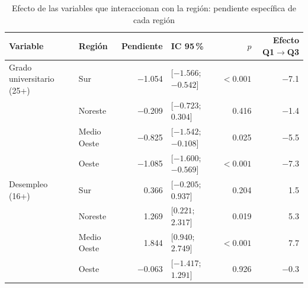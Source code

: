 \begin{table}[htbp]
\centering
\footnotesize
\caption{Efecto de las variables que interaccionan con la región: pendiente específica de cada región}\label{tab:pendientes}
\begin{tabular}{l l r l r r}
\toprule
Variable & Región & Pendiente & IC 95\,\% & $p$ & Efecto Q1$\to$Q3 \\
\midrule
Grado universitario (25+) & Sur & \num{-1.054} & $[\num{-1.566};$\allowbreak\ $\num{-0.542}]$ & $<\num{0.001}$ & \num{-7.1} \\
 & Noreste & \num{-0.209} & $[\num{-0.723};$\allowbreak\ $\num{0.304}]$ & \num{0.416} & \num{-1.4} \\
 & Medio Oeste & \num{-0.825} & $[\num{-1.542};$\allowbreak\ $\num{-0.108}]$ & \num{0.025} & \num{-5.5} \\
 & Oeste & \num{-1.085} & $[\num{-1.600};$\allowbreak\ $\num{-0.569}]$ & $<\num{0.001}$ & \num{-7.3} \\
\addlinespace
Desempleo (16+) & Sur & \num{0.366} & $[\num{-0.205};$\allowbreak\ $\num{0.937}]$ & \num{0.204} & \num{1.5} \\
 & Noreste & \num{1.269} & $[\num{0.221};$\allowbreak\ $\num{2.317}]$ & \num{0.019} & \num{5.3} \\
 & Medio Oeste & \num{1.844} & $[\num{0.940};$\allowbreak\ $\num{2.749}]$ & $<\num{0.001}$ & \num{7.7} \\
 & Oeste & \num{-0.063} & $[\num{-1.417};$\allowbreak\ $\num{1.291}]$ & \num{0.926} & \num{-0.3} \\
\bottomrule
\end{tabular}
\par{}
\end{table}
